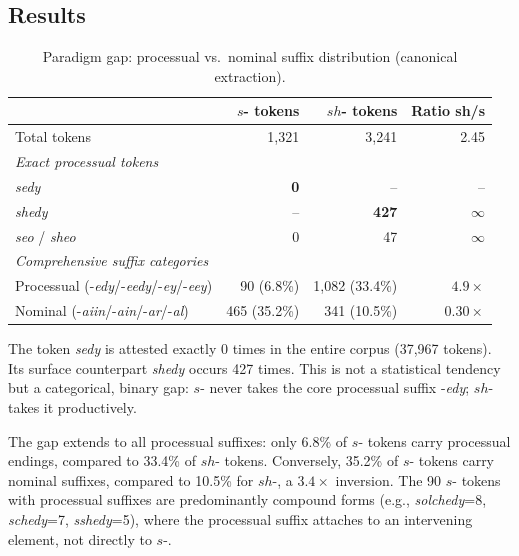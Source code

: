 \documentclass[11pt,a4paper]{article}
\begin{document}
\subsection{Results}

\begin{table}[H]
\centering
\small
\begin{tabular}{lrrr}
\toprule
                          & \textbf{$s$- tokens} & \textbf{$sh$- tokens} & \textbf{Ratio sh/s} \\
\midrule
Total tokens               & 1{,}321            & 3{,}241             & 2.45 \\
\midrule
\multicolumn{4}{l}{\textit{Exact processual tokens}} \\
\quad \textit{sedy}        & \textbf{0}         & --                  & --  \\
\quad \textit{shedy}       & --                & \textbf{427}        & $\infty$ \\
\quad \textit{seo} / \textit{sheo} & 0          & 47                  & $\infty$ \\
\midrule
\multicolumn{4}{l}{\textit{Comprehensive suffix categories}} \\
\quad Processual (-\textit{edy}/-\textit{eedy}/-\textit{ey}/-\textit{eey}) & 90 (6.8\%) & 1{,}082 (33.4\%) & $4.9\times$ \\
\quad Nominal (-\textit{aiin}/-\textit{ain}/-\textit{ar}/-\textit{al}) & 465 (35.2\%) & 341 (10.5\%) & $0.30\times$ \\
\bottomrule
\end{tabular}
\caption{Paradigm gap: processual vs.\ nominal suffix distribution (canonical extraction).}
\end{table}

The token \textit{sedy} is attested exactly 0 times in the entire corpus (37{,}967 tokens). Its surface counterpart \textit{shedy} occurs 427 times. This is not a statistical tendency but a categorical, binary gap: $s$- never takes the core processual suffix -\textit{edy}; $sh$- takes it productively.

The gap extends to all processual suffixes: only 6.8\% of $s$- tokens carry processual endings, compared to 33.4\% of $sh$- tokens. Conversely, 35.2\% of $s$- tokens carry nominal suffixes, compared to 10.5\% for $sh$-, a $3.4\times$ inversion. The 90 $s$- tokens with processual suffixes are predominantly compound forms (e.g., \textit{solchedy}=8, \textit{schedy}=7, \textit{sshedy}=5), where the processual suffix attaches to an intervening element, not directly to $s$-.
\end{document}
